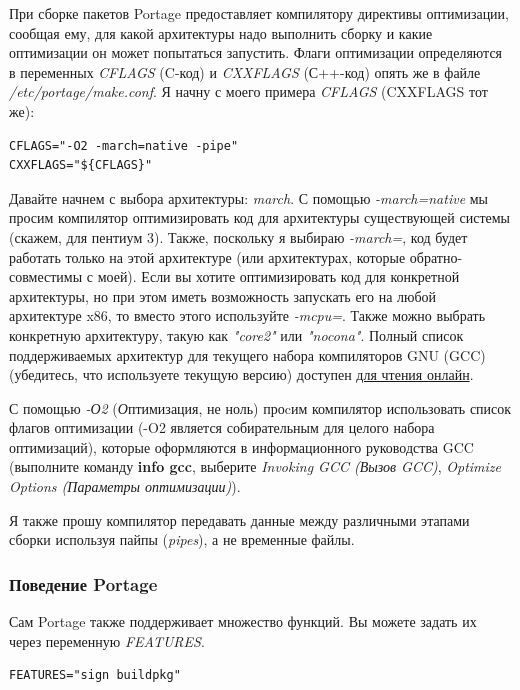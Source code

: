 \documentclass[10pt]{book}
\begin{document}
При сборке пакетов Portage предоставляет компилятору директивы оптимизации, сообщая ему, для какой архитектуры надо выполнить сборку и какие оптимизации он может попытаться запустить. Флаги оптимизации определяются в переменных \textit{CFLAGS} (C-код) и \textit{CXXFLAGS} (С++-код) опять же в файле \textit{/etc/portage/make.conf}.
Я начну с моего примера \textit{CFLAGS} (CXXFLAGS тот же):

\begin{tcolorbox}
\begin{lstlisting}
CFLAGS="-O2 -march=native -pipe"
CXXFLAGS="${CFLAGS}"
\end{lstlisting}
\end{tcolorbox}

Давайте начнем с выбора архитектуры: \textit{march}. С помощью \textit{-march=native} мы просим компилятор оптимизировать код для архитектуры существующей системы (скажем, для пентиум 3). Также, поскольку я выбираю \textit{-march=}, код будет работать только на этой архитектуре (или архитектурах, которые обратно-совместимы с моей). Если вы хотите оптимизировать код для конкретной архитектуры, но при этом иметь возможность запускать его на любой архитектуре x86, то вместо этого используйте \textit{-mcpu=}. Также можно выбрать конкретную архитектуру, такую как \textit{"core2"} или \textit{ "nocona"}. Полный список поддерживаемых архитектур для текущего набора компиляторов GNU (GCC) (убедитесь, что используете текущую версию) доступен \href{http://gcc.gnu.org/onlinedocs/gcc/i386-and-x86_002d64 - Options.html}{для чтения онлайн}.

С помощью \textit{-О2} (\textit{О}птимизация, не ноль) проcим компилятор использовать список флагов оптимизации (-O2 является собирательным для целого набора оптимизаций), которые оформляются в информационного руководства GCC (выполните команду \textbf{info gcc}, выберите \textit{ Invoking GCC (Вызов GCC)}, \textit{Optimize Options (Параметры оптимизации)}).

Я также прошу компилятор передавать данные между различными этапами сборки используя пайпы (\textit{pipes}), а не временные файлы.

\subsubsection{Поведение Portage}

Сам Portage также поддерживает множество функций. Вы можете задать их через переменную \textit{FEATURES}.

\begin{tcolorbox}
\begin{lstlisting}
FEATURES="sign buildpkg"
\end{lstlisting}
\end{tcolorbox}
\end{document}
